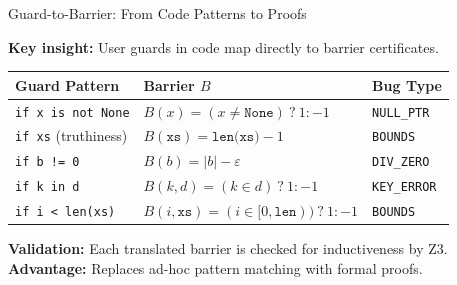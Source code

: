 \documentclass[aspectratio=169]{beamer}
\begin{document}
\begin{frame}{Guard-to-Barrier: From Code Patterns to Proofs}

\textbf{Key insight:} User guards in code map directly to barrier certificates.

\vspace{0.5em}
\begin{tabular}{lll}
\textbf{Guard Pattern} & \textbf{Barrier $B$} & \textbf{Bug Type} \\
\hline
\texttt{if x is not None} & $B(x) = (x \neq \texttt{None})\ ?\ 1 : {-}1$ & \texttt{NULL\_PTR} \\
\texttt{if xs} (truthiness) & $B(\texttt{xs}) = \texttt{len(xs)} - 1$ & \texttt{BOUNDS} \\
\texttt{if b != 0} & $B(b) = |b| - \varepsilon$ & \texttt{DIV\_ZERO} \\
\texttt{if k in d} & $B(k,d) = (k \in d)\ ?\ 1 : {-}1$ & \texttt{KEY\_ERROR} \\
\texttt{if i < len(xs)} & $B(i,\texttt{xs}) = (i \in [0, \texttt{len}))\ ?\ 1 : {-}1$ & \texttt{BOUNDS} \\
\end{tabular}

\vspace{0.5em}
\textbf{Validation:} Each translated barrier is checked for inductiveness by Z3.\\
\textbf{Advantage:} Replaces ad-hoc pattern matching with formal proofs.

\end{frame}
\end{document}
